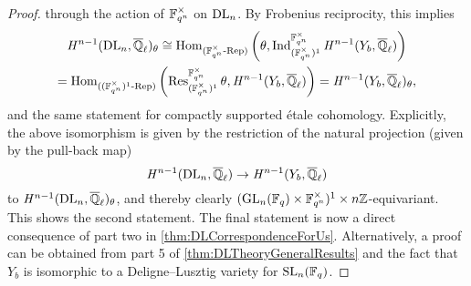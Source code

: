 \documentclass[../main.tex]{subfiles}
\begin{document}
\begin{lem}
\begin{proof}
  through the action of $\mathbb{F}_{q^n}^\times$ on $\mathrm{DL}_n$. 
  By Frobenius reciprocity, this implies
\begin{multline*}
      \mathit H^{n-1}(\mathrm{DL}_n, {\overline {\mathbb{Q}}_\ell})_\theta \cong 
      \operatorname{Hom}_{{({\mathbb{F}_{q^n}^\times}\textnormal-\allowbreak\mathrm{Rep})}}\left(\theta,
      \operatorname{Ind}_{(\mathbb{F}_{q^n}^\times)^1}^{\mathbb{F}_{q^n}^\times}\mathit H^{n-1}(Y_b, {\overline {\mathbb{Q}}_\ell}) \right) \\
      = 
      \operatorname{Hom}_{{({(\mathbb{F}_{q^n}^\times)^1}\textnormal-\allowbreak\mathrm{Rep})}}
      \left(\operatorname{Res}^{\mathbb{F}_{q^n}^\times}_{(\mathbb{F}_{q^n}^\times)^1} \theta,
        \mathit H^{n-1}(Y_b, {\overline {\mathbb{Q}}_\ell}) \right) = \mathit H^{n-1}(Y_b, {\overline {\mathbb{Q}}_\ell})_\theta,
\end{multline*}
  and the same statement for compactly supported \'etale cohomology. 
  Explicitly, the above isomorphism is given by the restriction of the natural projection (given by the pull-back map)
    \begin{equation*}
      \mathit H^{n-1}(\mathrm{DL}_n, {\overline {\mathbb{Q}}_\ell}) \to \mathit H^{n-1}(Y_b, {\overline {\mathbb{Q}}_\ell})
    \end{equation*}
    to $\mathit H^{n-1}(\mathrm{DL}_n, {\overline {\mathbb{Q}}_\ell})_\theta$,
    and thereby clearly $(\operatorname{GL}_n(\mathbb{F}_q) \times \mathbb{F}_{q^n}^\times)^1 \times
    n\mathbb{Z}$-equivariant. This shows the second statement.
    The final statement is now a direct consequence of part two in \cref{thm:DLCorrespondenceForUs}. Alternatively, a proof can be obtained from part 5 of \cref{thm:DLTheoryGeneralResults} and the fact that $Y_b$ is isomorphic to a Deligne--Lusztig variety for $\operatorname{SL}_n(\mathbb{F}_q)$.
\end{proof}
\end{lem}


\end{document}
